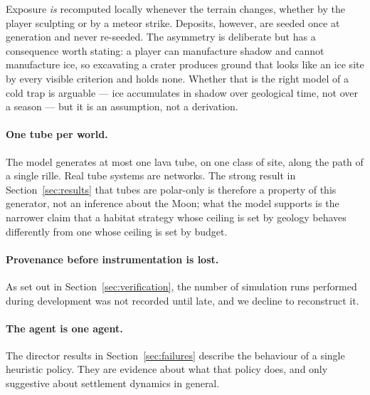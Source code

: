 Exposure \emph{is} recomputed locally whenever the terrain changes, whether by
the player sculpting or by a meteor strike. Deposits, however, are seeded once
at generation and never re-seeded. The asymmetry is deliberate but has a
consequence worth stating: a player can manufacture shadow and cannot
manufacture ice, so excavating a crater produces ground that looks like an ice
site by every visible criterion and holds none. Whether that is the right
model of a cold trap is arguable --- ice accumulates in shadow over geological
time, not over a season --- but it is an assumption, not a derivation.

\paragraph{One tube per world.}
The model generates at most one lava tube, on one class of site, along the path
of a single rille. Real tube systems are networks. The strong result in
Section~\ref{sec:results} that tubes are polar-only is therefore a property of
this generator, not an inference about the Moon; what the model supports is the
narrower claim that a habitat strategy whose ceiling is set by geology behaves
differently from one whose ceiling is set by budget.

\paragraph{Provenance before instrumentation is lost.}
As set out in Section~\ref{sec:verification}, the number of simulation runs
performed during development was not recorded until late, and we decline to
reconstruct it.

\paragraph{The agent is one agent.}
The director results in Section~\ref{sec:failures} describe the behaviour of a
single heuristic policy. They are evidence about what that policy does, and
only suggestive about settlement dynamics in general.
